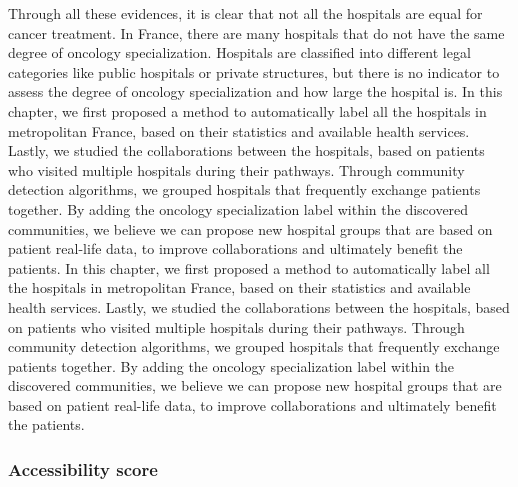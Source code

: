 Through all these evidences, it is clear that not all the hospitals are equal
for cancer treatment. In France, there are many hospitals that do not have the
same degree of oncology specialization. Hospitals are classified into different
legal categories like public hospitals or private structures, but there is no
indicator to assess the degree of oncology specialization and how large the
hospital is. In this chapter, we first proposed a method to automatically label
all the hospitals in metropolitan France, based on their statistics and
available health services. Lastly, we studied the collaborations between
the hospitals, based on patients who visited multiple hospitals during their
pathways. Through community detection algorithms, we grouped hospitals that
frequently exchange patients together. By adding the oncology specialization
label within the discovered communities, we believe we can propose new
hospital groups that are based on patient real-life data, to improve
collaborations and ultimately benefit the patients.
In this chapter, we first proposed a method to automatically label
all the hospitals in metropolitan France, based on their statistics and
available health services. Lastly, we studied the collaborations between
the hospitals, based on patients who visited multiple hospitals during their
pathways. Through community detection algorithms, we grouped hospitals that
frequently exchange patients together. By adding the oncology specialization
label within the discovered communities, we believe we can propose new
hospital groups that are based on patient real-life data, to improve
collaborations and ultimately benefit the patients.

\subsubsection{Accessibility score}

